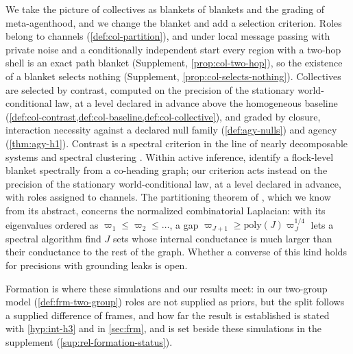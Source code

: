 We take the picture of collectives as blankets of blankets and the grading of meta-agenthood, and we change the blanket and add a selection criterion. Roles belong to channels (\cref{def:col-partition}), and under local message passing with private noise and a conditionally independent start every region with a two-hop shell is an exact path blanket (Supplement, \cref{prop:col-two-hop}), so the existence of a blanket selects nothing (Supplement, \cref{prop:col-selects-nothing}). Collectives are selected by contrast, computed on the precision of the stationary world-conditional law, at a level declared in advance above the homogeneous baseline (\cref{def:col-contrast,def:col-baseline,def:col-collective}), and graded by closure, interaction necessity against a declared null family (\cref{def:agy-nulls}) and agency (\cref{thm:agy-h1}). Contrast is a spectral criterion in the line of nearly decomposable systems \citep{simon1961aggregation} and spectral clustering \citep{kannan2004clusterings}. Within active inference, \citet{maisto2025flock} identify a flock-level blanket spectrally from a co-heading graph; our criterion acts instead on the precision of the stationary world-conditional law, at a level declared in advance, with roles assigned to channels. The partitioning theorem of \citet{oveisgharan2014partitioning}, which we know from its abstract, concerns the normalized combinatorial Laplacian: with its eigenvalues ordered as $\varpi_1\le\varpi_2\le\dots$, a gap $\varpi_{J+1}\ge\mathrm{poly}(J)\varpi_J^{1/4}$ lets a spectral algorithm find $J$ sets whose internal conductance is much larger than their conductance to the rest of the graph. Whether a converse of this kind holds for precisions with grounding leaks is open.

Formation is where these simulations and our results meet: in our two-group model (\cref{def:frm-two-group}) roles are not supplied as priors, but the split follows a supplied difference of frames, and how far the result is established is stated with \cref{hyp:int-h3} and in \cref{sec:frm}, and is set beside these simulations in the supplement (\cref{sup:rel-formation-status}).

